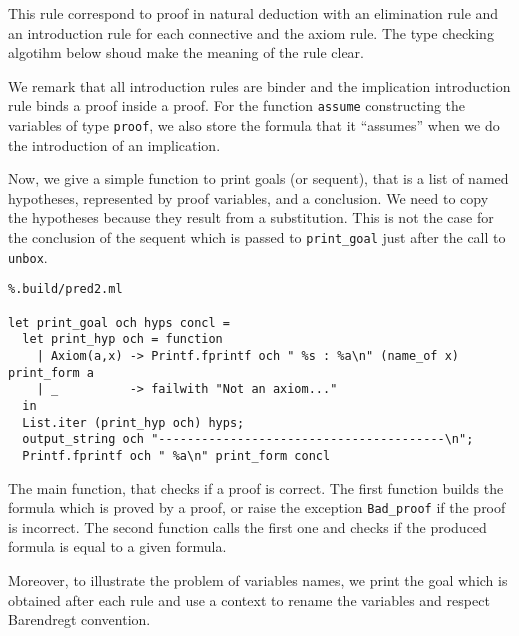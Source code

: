 \documentclass[11pt]{article}
\begin{document}
This rule correspond to proof in natural deduction with an elimination
rule and an introduction rule for each connective and the axiom rule.
The type checking algotihm below shoud make the meaning of the rule clear.

We remark that all introduction rules are binder and the
implication introduction rule binds a proof inside a proof.
For the function \verb#assume# constructing the variables of type
\verb#proof#, we also store the formula that it ``assumes'' when we do
the introduction of an implication.

Now, we give a simple function to print goals (or sequent), that is a
list of named hypotheses, represented by proof variables, and a
conclusion. We need to copy the hypotheses because they result from a
substitution. This is not the case for the conclusion of the sequent
which is passed to \verb#print_goal# just after the call to \verb#unbox#.
\begin{lstlisting}%.build/pred2.ml

let print_goal och hyps concl =
  let print_hyp och = function
    | Axiom(a,x) -> Printf.fprintf och " %s : %a\n" (name_of x) print_form a
    | _          -> failwith "Not an axiom..."
  in
  List.iter (print_hyp och) hyps;
  output_string och "----------------------------------------\n";
  Printf.fprintf och " %a\n" print_form concl
\end{lstlisting}

The main function, that checks if a proof is correct. The first
function builds the formula which is proved by a proof, or raise the
exception \verb#Bad_proof# if the proof is incorrect.
The second function calls the first one and checks if the produced
formula is equal to a given formula.

Moreover, to illustrate the problem of variables names, we print the
goal which is obtained after each rule and use a context to rename the
variables and respect Barendregt convention.
\end{document}
